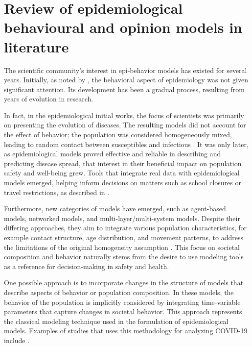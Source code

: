 
\chapter{Review of epidemiological behavioural and opinion models in literature}
\label{ch:literature_review}
The scientific community's interest in epi-behavior models has existed for several years. Initially, as noted by \cite{Bauch_2012_overview}, the behavioral aspect of epidemiology was not given significant attention. Its development has been a gradual process, resulting from years of evolution in research.

In fact, in the epidemiological initial works, the focus of scientists was primarily on presenting the evolution of diseases. The resulting models did not account for the effect of behavior; the population was considered homogeneously mixed, leading to random contact between susceptibles and infectious \cite{Hernandez_Vargas_2022, Mata2021}. 
It was only later, as epidemiological models proved effective and reliable in describing and predicting disease spread, that interest in their beneficial impact on population safety and well-being grew. Tools that integrate real data with epidemiological models emerged, helping inform decisions on matters such as school closures or travel restrictions, as described in \cite{Bauch_2012_overview}.

Furthermore, new categories of models have emerged, such as agent-based models, networked models, and multi-layer/multi-system models. Despite their differing approaches, they aim to integrate various population characteristics, for example contact structure, age distribution, and movement patterns, to address the limitations of the original homogeneity assumption \cite{brauer2012mathematical}.
This focus on societal composition and behavior naturally stems from the desire to use modeling tools as a reference for decision-making in safety and health. 

One possible approach is to incorporate changes in the structure of models that describe aspects of behavior or population composition. In these models, the behavior of the population is implicitly considered by integrating time-variable parameters that capture changes in societal behavior. This approach represents the classical modeling technique used in the formulation of epidemiological models. Examples of studies that uses this methodology for analyzing COVID-19 include \cite{Giordano_2020, Dehning_2020, Proverbio_2021}.

